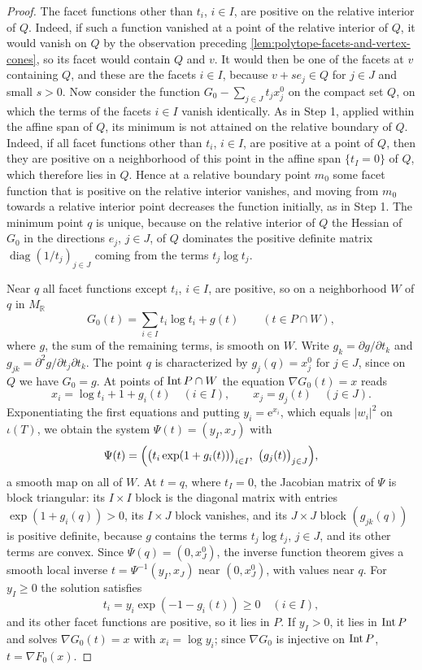 \begin{proof}
The facet functions other than $t_i$, $i\in I$, are positive on the relative interior of $Q$. Indeed, if such a function vanished at a point of the relative interior of $Q$, it would vanish on $Q$ by the observation preceding \cref{lem:polytope-facets-and-vertex-cones}, so its facet would contain $Q$ and $v$. It would then be one of the facets at $v$ containing $Q$, and these are the facets $i\in I$, because $v+se_j\in Q$ for $j\in J$ and small $s>0$. Now consider the function $G_0-\sum_{j\in J}t_jx^0_j$ on the compact set $Q$, on which the terms of the facets $i\in I$ vanish identically. As in Step 1, applied within the affine span of $Q$, its minimum is not attained on the relative boundary of $Q$. Indeed, if all facet functions other than $t_i$, $i\in I$, are positive at a point of $Q$, then they are positive on a neighborhood of this point in the affine span $\{t_I=0\}$ of $Q$, which therefore lies in $Q$. Hence at a relative boundary point $m_0$ some facet function that is positive on the relative interior vanishes, and moving from $m_0$ towards a relative interior point decreases the function initially, as in Step 1. The minimum point $q$ is unique, because on the relative interior of $Q$ the Hessian of $G_0$ in the directions $e_j$, $j\in J$, of $Q$ dominates the positive definite matrix $\operatorname{diag}(1/t_j)_{j\in J}$ coming from the terms $t_j\log t_j$.

Near $q$ all facet functions except $t_i$, $i\in I$, are positive, so on a neighborhood $W$ of $q$ in $M_{\mathbb R}$
\[
 G_0(t)=\sum_{i\in I}t_i\log t_i+g(t)\qquad(t\in P\cap W),
\]
where $g$, the sum of the remaining terms, is smooth on $W$. Write $g_k=\partial g/\partial t_k$ and $g_{jk}=\partial^2g/\partial t_j\partial t_k$. The point $q$ is characterized by $g_j(q)=x_j^0$ for $j\in J$, since on $Q$ we have $G_0=g$. At points of $\operatorname{Int} P\cap W$ the equation $\nabla G_0(t)=x$ reads
\[
 x_i=\log t_i+1+g_i(t)\quad(i\in I),\qquad
 x_j=g_j(t)\quad(j\in J).
\]
Exponentiating the first equations and putting $y_i=\mathrm e^{x_i}$, which equals $|w_i|^2$ on $\iota(T)$, we obtain the system $\Psi(t)=(y_I,x_J)$ with
\[
 \Psi(t)=\Bigl(\bigl(t_i\exp(1+g_i(t))\bigr)_{i\in I},\ \bigl(g_j(t)\bigr)_{j\in J}\Bigr),
\]
a smooth map on all of $W$. At $t=q$, where $t_I=0$, the Jacobian matrix of $\Psi$ is block triangular: its $I\times I$ block is the diagonal matrix with entries $\exp(1+g_i(q))>0$, its $I\times J$ block vanishes, and its $J\times J$ block $(g_{jk}(q))$ is positive definite, because $g$ contains the terms $t_j\log t_j$, $j\in J$, and its other terms are convex. Since $\Psi(q)=(0,x_J^0)$, the inverse function theorem gives a smooth local inverse $t=\Psi^{-1}(y_I,x_J)$ near $(0,x_J^0)$, with values near $q$. For $y_I\geq0$ the solution satisfies
\[
 t_i=y_i\exp(-1-g_i(t))\geq0\quad(i\in I),
\]
and its other facet functions are positive, so it lies in $P$. If $y_I>0$, it lies in $\operatorname{Int} P$ and solves $\nabla G_0(t)=x$ with $x_i=\log y_i$; since $\nabla G_0$ is injective on $\operatorname{Int} P$, $t=\nabla F_0(x)$.


\end{proof}
